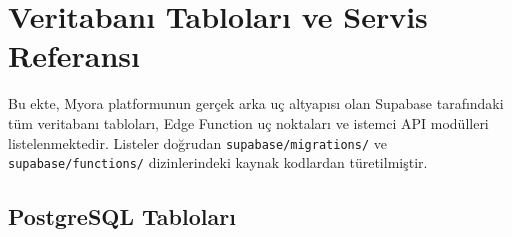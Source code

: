 \appendix
\section{Veritabanı Tabloları ve Servis Referansı}
\label{app:api}

Bu ekte, Myora platformunun gerçek arka uç altyapısı olan Supabase tarafındaki tüm veritabanı tabloları, Edge Function uç noktaları ve istemci API modülleri listelenmektedir. Listeler doğrudan \texttt{supabase/migrations/} ve \texttt{supabase/functions/} dizinlerindeki kaynak kodlardan türetilmiştir.

\subsection{PostgreSQL Tabloları}

